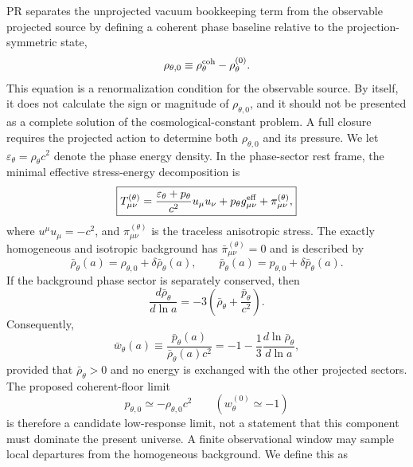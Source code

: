\documentclass[11pt]{article}
\begin{document}
PR separates the unprojected vacuum bookkeeping term from the observable projected source by defining a coherent phase baseline relative to the projection-symmetric state,
\begin{equation}
\rho_{\theta,0}
\equiv
\rho_{\theta}^{\rm coh}
-
\rho_{\theta}^{(0)}.
\end{equation}
This equation is a renormalization condition for the observable source. By itself, it does not calculate the sign or magnitude of \(\rho_{\theta,0}\), and it should not be presented as a complete solution of the cosmological-constant problem. A full closure requires the projected action to determine both \(\rho_{\theta,0}\) and its pressure. We let \(\varepsilon_\theta=\rho_\theta c^2\) denote the phase energy density. In the phase-sector rest frame, the minimal effective stress-energy decomposition is
\begin{equation}
\boxed{
T_{\mu\nu}^{(\theta)}
=
\frac{\varepsilon_\theta+p_\theta}{c^2}
 u_\mu u_\nu
+
p_\theta g_{\mu\nu}^{\rm eff}
+
\pi_{\mu\nu}^{(\theta)},
}
\end{equation}
where \(u^\mu u_\mu=-c^2\), and \(\pi_{\mu\nu}^{(\theta)}\) is the traceless anisotropic stress. The exactly homogeneous and isotropic background has \(\bar\pi_{\mu\nu}^{(\theta)}=0\) and is described by
\begin{equation}
\bar\rho_\theta(a)
=
\rho_{\theta,0}
+
\delta\bar\rho_\theta(a),
\qquad
\bar p_\theta(a)
=
p_{\theta,0}
+
\delta\bar p_\theta(a).
\end{equation}
If the background phase sector is separately conserved, then
\begin{equation}
\frac{d\bar\rho_\theta}{d\ln a}
=
-3\left(
\bar\rho_\theta
+
\frac{\bar p_\theta}{c^2}
\right).
\end{equation}
Consequently,
\begin{equation}
\boxed{
\bar w_\theta(a)
\equiv
\frac{\bar p_\theta(a)}{\bar\rho_\theta(a)c^2}
=
-1
-
\frac{1}{3}
\frac{d\ln\bar\rho_\theta}{d\ln a},
}
\end{equation}
provided that \(\bar\rho_\theta>0\) and no energy is exchanged with the other projected sectors. The proposed coherent-floor limit
\begin{equation}
 p_{\theta,0}\simeq-\rho_{\theta,0}c^2
 \qquad
 (w_{\theta}^{(0)}\simeq-1)
\end{equation}
is therefore a candidate low-response limit, not a statement that this component must dominate the present universe. A finite observational window may sample local departures from the homogeneous background. We define this as
\end{document}
